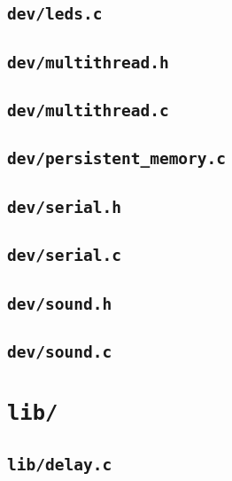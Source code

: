 \documentclass[a4paper,10pt]{article}
\begin{document}
\subsection{\texttt{dev/leds.c}}


\subsection{\texttt{dev/multithread.h}}


\subsection{\texttt{dev/multithread.c}}


\subsection{\texttt{dev/persistent\_memory.c}}


\subsection{\texttt{dev/serial.h}}


\subsection{\texttt{dev/serial.c}}


\subsection{\texttt{dev/sound.h}}


\subsection{\texttt{dev/sound.c}}


\section{\texttt{lib/}}

\subsection{\texttt{lib/delay.c}}

\end{document}
